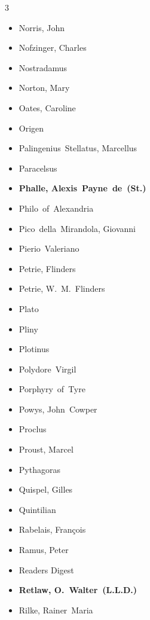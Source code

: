 \documentclass[10pt,makeidx]{extreport}
\begin{document}
\begin{multicols}{3}
\begin{itemize}
		\item Norris, John
		\item Nofzinger, Charles
		\item Nostradamus
		\item Norton, Mary
		\item Oates, Caroline
		\item Origen
		\item Palingenius~Stellatus, Marcellus
		\item Paracelsus
		\item \textbf{Phalle, Alexis~Payne~de~(St.)}
		\item Philo~of~Alexandria
		\item Pico~della~Mirandola, Giovanni
		\item Pierio~Valeriano
		\item Petrie, Flinders
		\item Petrie, W.~M.~Flinders
		\item Plato
		\item Pliny
		\item Plotinus
		\item Polydore~Virgil
		\item Porphyry~of~Tyre
		\item Powys, John~Cowper
		\item Proclus
		\item Proust, Marcel
		\item Pythagoras
		\item Quispel, Gilles
		\item Quintilian
		\item Rabelais, François
		\item Ramus, Peter
		\item Readers Digest
		\item \textbf{Retlaw, O.~Walter~(L.L.D.)}
		\item Rilke, Rainer~Maria

\end{itemize}
\end{multicols}
\end{document}
